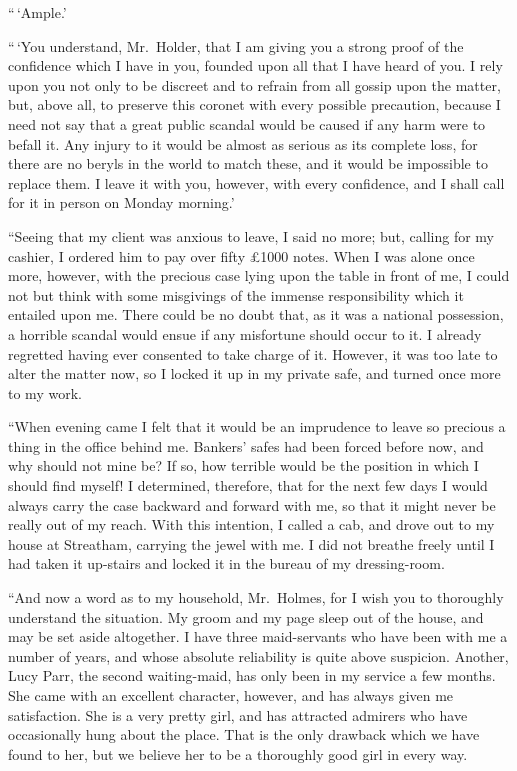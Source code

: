 “\,‘Ample.’

“\,‘You understand, Mr.~Holder, that I am giving you a
strong proof of the confidence which I have in you, founded
upon all that I have heard of you. I rely upon you not
only to be discreet and to refrain from all gossip upon the
matter, but, above all, to preserve this coronet with every
possible precaution, because I need not say that a great
public scandal would be caused if any harm were to befall it.
Any injury to it would be almost as serious as its complete
loss, for there are no beryls in the world to match these, and
it would be impossible to replace them. I leave it with you,
however, with every confidence, and I shall call for it in person
on Monday morning.’

“Seeing that my client was anxious to leave, I said no
more; but, calling for my cashier, I ordered him to pay over
fifty £1000 notes. When I was alone once more, however,
with the precious case lying upon the table in front of me,
I could not but think with some misgivings of the immense
responsibility which it entailed upon me. There could be
no doubt that, as it was a national possession, a horrible
scandal would ensue if any misfortune should occur to it. I
already regretted having ever consented to take charge of it.
However, it was too late to alter the matter now, so I locked
it up in my private safe, and turned once more to my work.

“When evening came I felt that it would be an imprudence
to leave so precious a thing in the office behind me. Bankers’
safes had been forced before now, and why should not mine
be? If so, how terrible would be the position in which I
should find myself! I determined, therefore, that for the
next few days I would always carry the case backward and
forward with me, so that it might never be really out of my
reach. With this intention, I called a cab, and drove out to
my house at Streatham, carrying the jewel with me. I did
not breathe freely until I had taken it up-stairs and locked it
in the bureau of my dressing-room.

“And now a word as to my household, Mr.~Holmes, for I
wish you to thoroughly understand the situation. My groom
and my page sleep out of the house, and may be set aside
altogether. I have three maid-servants who have been with
me a number of years, and whose absolute reliability is quite
above suspicion. Another, Lucy Parr, the second waiting-maid,
has only been in my service a few months. She came
with an excellent character, however, and has always given me
satisfaction. She is a very pretty girl, and has attracted admirers
who have occasionally hung about the place. That is
the only drawback which we have found to her, but we believe
her to be a thoroughly good girl in every way.

